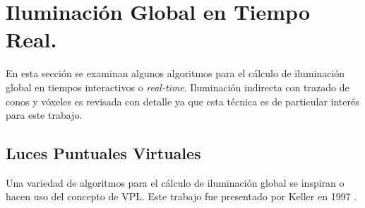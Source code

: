 \section{Iluminación Global en Tiempo Real.}
En esta sección se examinan algunos algoritmos para el cálculo de iluminación global en tiempos interactivos o \emph{real-time}. Iluminación indirecta con trazado de conos y vóxeles es revisada con detalle ya que esta técnica es de particular interés para este trabajo.

\subsection{Luces Puntuales Virtuales}
Una variedad de algoritmos para el cálculo de iluminación global se inspiran o hacen uso del concepto de \ac{VPL}. Este trabajo fue presentado por Keller en 1997 \cite{Keller:1997}.

